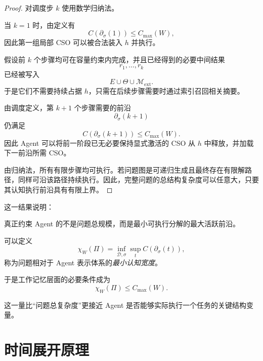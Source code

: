 \begin{proof}
对调度步 $k$ 使用数学归纳法。

当 $k=1$ 时，由定义有
\begin{equation}
C(\partial_\sigma(1))
\leq
C_{\max}(W),
\end{equation}
因此第一组局部 CSO 可以被合法装入 $h$ 并执行。

假设前 $k$ 个步骤均可在容量约束内完成，并且已经得到的必要中间结果
\begin{equation}
r_1,\ldots,r_k
\end{equation}
已经被写入
\begin{equation}
E\cup\Theta\cup\mathcal M_{\mathrm{ext}}.
\end{equation}
于是它们不需要持续占据 $h$，只需在后续步骤需要时通过索引召回相关摘要。

由调度定义，第 $k+1$ 个步骤需要的前沿
\begin{equation}
\partial_\sigma(k+1)
\end{equation}
仍满足
\begin{equation}
C(\partial_\sigma(k+1))
\leq
C_{\max}(W).
\end{equation}
因此 Agent 可以将前一阶段已无必要保持显式激活的 CSO 从 $h$ 中释放，并加载下一前沿所需 CSO。

由归纳法，所有有限步骤均可执行。若问题图是可递归生成且最终存在有限解路径，同样可沿该路径持续执行。因此，完整问题的总结构复杂度可以任意大，只要其认知执行前沿具有有限上界。
\end{proof}

这一结果说明：

\begin{statementbox}
真正约束 Agent 的不是问题总规模，而是最小可执行分解的最大活跃前沿。
\end{statementbox}

可以定义
\begin{equation}
\chi_W(\Pi)
=
\inf_{\mathcal D,\sigma}
\sup_t
C(
\partial_\sigma(t)
),
\end{equation}
称为问题相对于 Agent 表示体系的\emph{最小认知宽度}。

于是工作记忆层面的必要条件成为
\begin{equation}
\boxed{
\chi_W(\Pi)
\leq
C_{\max}(W).
}
\label{eq:cognitive-width}
\end{equation}

这一量比“问题总复杂度”更接近 Agent 是否能够实际执行一个任务的关键结构变量。

\section{时间展开原理}

